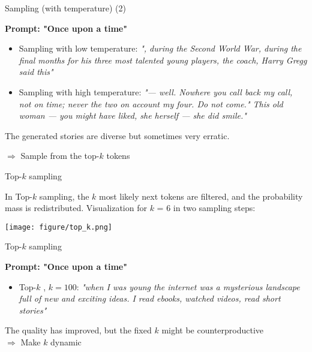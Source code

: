 
\begin{vbframe}{Sampling (with temperature) (2)}

\vfill

\textbf{Prompt: "Once upon a time"}
\begin{itemize}
\item Sampling with low temperature: \textit{", during the Second World War, during the final months for his three most talented young players, the coach, Harry Gregg said this"}
\item Sampling with high temperature: \textit{"— well. Nowhere you call back my call, not on time; never the two on account my four. Do not come." This old woman — you might have liked, she herself — she did smile."}
\end{itemize}

The generated stories are diverse but sometimes very erratic.\\

\vfill

$\Rightarrow$ Sample from the top-$k$ tokens     

\end{vbframe}


\begin{vbframe}{Top-$k$ sampling } 


In Top-$k$ sampling, the $k$ most likely next tokens are filtered, and the probability mass is redistributed.
Visualization for $k$ = 6 in two sampling steps:

\begin{center}
    \texttt{[image: figure/top\_k.png]}
\end{center}


\end{vbframe}


\begin{vbframe}{Top-$k$ sampling}

\vfill

\textbf{Prompt: "Once upon a time"}
\begin{itemize}
    \item Top-$k$ , $k = 100$: \textit{"when I was young the internet was a mysterious landscape full of new and exciting ideas. I read ebooks, watched videos, read short stories"}
\end{itemize}
\vspace{2ex}

The quality has improved, but the fixed $k$ might be counterproductive\\
\vspace{2ex}
$\Rightarrow$ Make $k$ dynamic        


\end{vbframe}

